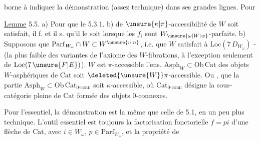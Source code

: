 borne à indiquer la démonstration (assez technique) dans ses grandes lignes. Pour 

\uline{Lemme} 5.5. a) Pour que le   5.3.1. b) de $\unsure{\kappa|\pi}$-accessibilité de $W$ soit satisfait, il f. et il s. qu'il le soit lorsque les $f_i$ sont $W_{\unsure{\omega|W|w}}$-parfaits.
b) Supposons que $\mathrm{Parf}_{W_\omega}\cap W\subset W^{\unsure{u|n}}$, i.e. que $W$ satisfait à $\mathrm{Loc}(7\,D_{W_\omega})$ - (la plus faible des variantes de l'axiome des $W$-fibrations, à l'exception seulement de $\mathrm{Loc}(7\,\unsure{F|E})$).   $W$ est $\pi$-accessible  l'ens. $\mathrm{Asph}_W\subset\mathrm{Ob}\,\mathrm{Cat}$ des objets $W$-asphériques de $\mathrm{Cat}$ soit $\deleted{\unsure{W}}\pi$-accessible.  Ou , que  la partie $\mathrm{Asph}_W\subset\mathrm{Ob}\,\mathrm{Cat}_{0\text{-conn}}$ soit $\kappa$-accessible, où $\mathrm{Cat}_{0\text{-conn}}$ désigne la sous-catégorie pleine de $\mathrm{Cat}$ formée des objets $0$-connexes.

Pour l'essentiel, la démonstration est la même que celle de 5.1, en un peu plus technique. L'outil essentiel est toujours la factorisation fonctorielle $f=pi$  d'une flèche de $\mathrm{Cat}$, avec $i\in W_\omega$, $p\in\mathrm{Parf}_{W_\omega}$, et la propriété de
